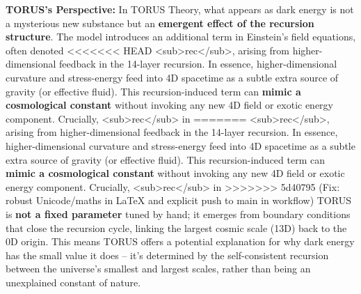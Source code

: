 \documentclass[]{article}
\begin{document}
\textbf{TORUS's Perspective:} In TORUS Theory, what appears as dark
energy is not a mysterious new substance but an \textbf{emergent effect
of the recursion structure}. The model introduces an additional term in
Einstein's field equations, often denoted
<<<<<<< HEAD
\emph{\Lambda}\textless sub\textgreater rec\textless/sub\textgreater, arising
from higher-dimensional feedback in the 14-layer recursion\hspace{0pt}.
In essence, higher-dimensional curvature and stress-energy feed into 4D
spacetime as a subtle extra source of gravity (or effective
fluid)\hspace{0pt}. This recursion-induced term can \textbf{mimic a
cosmological constant} without invoking any new 4D field or exotic
energy component\hspace{0pt}. Crucially,
\emph{\Lambda}\textless sub\textgreater rec\textless/sub\textgreater{} in
=======
\emph{\Lambda}\textless{}sub\textgreater{}rec\textless{}/sub\textgreater{},
arising from higher-dimensional feedback in the 14-layer recursion​. In
essence, higher-dimensional curvature and stress-energy feed into 4D
spacetime as a subtle extra source of gravity (or effective fluid)​.
This recursion-induced term can \textbf{mimic a cosmological constant}
without invoking any new 4D field or exotic energy component​.
Crucially,
\emph{\Lambda}\textless{}sub\textgreater{}rec\textless{}/sub\textgreater{} in
>>>>>>> 5d40795 (Fix: robust Unicode/maths in LaTeX and explicit push to main in workflow)
TORUS is \textbf{not a fixed parameter} tuned by hand; it emerges from
boundary conditions that close the recursion cycle, linking the largest
cosmic scale (13D) back to the 0D origin​. This means TORUS offers a
potential explanation for why dark energy has the small value it does --
it's determined by the self-consistent recursion between the universe's
smallest and largest scales, rather than being an unexplained constant
of nature.
\end{document}
